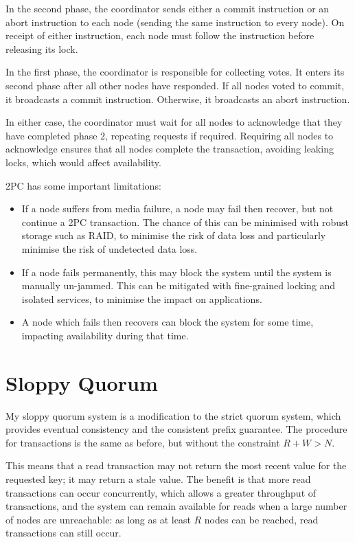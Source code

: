 \documentclass[12pt,a4paper,twoside,openany]{report}
\begin{document}
In the second phase, the coordinator sends either a commit instruction or an abort instruction to each node (sending the same instruction to every node). On receipt of either instruction, each node must follow the instruction before releasing its lock.

In the first phase, the coordinator is responsible for collecting votes. It enters its second phase after all other nodes have responded. If all nodes voted to commit, it broadcasts a commit instruction. Otherwise, it broadcasts an abort instruction.

In either case, the coordinator must wait for all nodes to acknowledge that they have completed phase 2, repeating requests if required. Requiring all nodes to acknowledge ensures that all nodes complete the transaction, avoiding leaking locks, which would affect availability.

2PC has some important limitations:

\begin{itemize}
\item
If a node suffers from media failure, a node may fail then recover, but not continue a 2PC transaction. The chance of this can be minimised with robust storage such as RAID, to minimise the risk of data loss and particularly minimise the risk of undetected data loss.

\item
If a node fails permanently, this may block the system until the system is manually un-jammed. This can be mitigated with fine-grained locking and isolated services, to minimise the impact on applications.

\item
A node which fails then recovers can block the system for some time, impacting availability during that time.

\end{itemize}

\section{Sloppy Quorum}

My sloppy quorum system is a modification to the strict quorum system, which provides eventual consistency and the consistent prefix guarantee. The procedure for transactions is the same as before, but without the constraint $R + W > N$.

This means that a read transaction may not return the most recent value for the requested key; it may return a stale value. The benefit is that more read transactions can occur concurrently, which allows a greater throughput of transactions, and the system can remain available for reads when a large number of nodes are unreachable: as long as at least $R$ nodes can be reached, read transactions can still occur.
\end{document}

